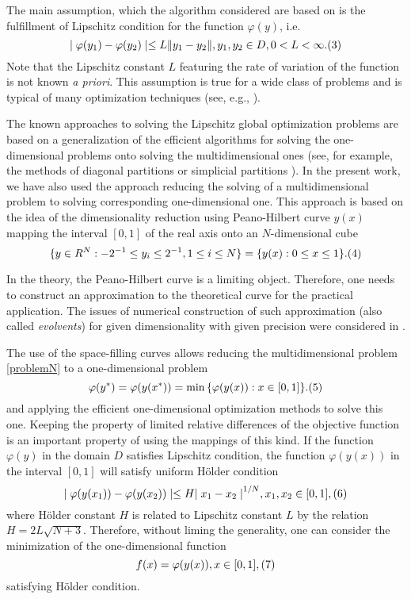 \documentclass[runningheads]{llncs}
\begin{document}
The main assumption, which the algorithm considered are based on is the fulfillment of Lipschitz condition for the function $\varphi(y)$, i.e.
$$ \mid \varphi(y_1) - \varphi(y_2) \mid \leq L\|y_1 - y_2\|, y_1, y_2 \in D, 0 < L < \infty. \relax(3)$$
Note that the Lipschitz constant $L$ featuring the rate of variation of the function is not known \textit{a priori}. This assumption is true for a wide class of problems and is typical of many optimization techniques (see, e.g., \cite{Evtushenko2013,Jones2009,Paulavicius2014}).

The known approaches to solving the Lipschitz global optimization problems are based on a generalization of the efficient algorithms for solving the one-dimensional problems onto solving the multidimensional ones (see, for example, the methods of diagonal partitions \cite{Sergeyev2017} or simplicial partitions \cite{PaulaviciusZilinskas2014}). In the present work, we have also used the approach reducing the solving of a multidimensional problem to solving corresponding one-dimensional one. This approach is based on the idea of the dimensionality reduction using Peano-Hilbert curve $y(x)$ mapping the interval $[0,1]$ of the real axis onto an $N$-dimensional cube 
$$ \{ y \in R^{N}: -2^{-1} \leq y_i \leq 2^{-1}, 1 \leq i \leq N\} = \{y(x): 0 \leq x \leq 1 \}.    \relax(4)$$

In the theory, the Peano-Hilbert curve is a limiting object. Therefore, one needs to construct an approximation to the theoretical curve for the practical application. The issues of numerical construction of such approximation (also called \textit{evolvents}) for given dimensionality with given precision were considered in \cite{Sergeyev2013}.

The use of the space-filling curves allows reducing the multidimensional problem \ref{problemN} to a one-dimensional problem 
$$\varphi(y^*) = \varphi(y(x^*)) = \min{\{ \varphi(y(x)): x \in [0, 1] \}}. \relax(5)$$
and applying the efficient one-dimensional optimization methods to solve this one. Keeping the property of limited relative differences of the objective function is an important property of using the mappings of this kind. If the function $\varphi(y)$ in the domain $D$ satisfies Lipschitz condition, the function $\varphi(y(x))$ in the interval $[0,1]$ will satisfy uniform H{\"o}lder condition
$$\mid \varphi(y(x_1)) - \varphi(y(x_2)) \mid \leq H {\mid x_1 - x_2 \mid}^{1/N}, x_1, x_2 \in [0,1], \relax(6)$$
where H{\"o}lder constant $H$ is related to Lipschitz constant $L$ by the relation $H = 2L\sqrt{N+3}$. Therefore, without liming the generality, one can consider the minimization of the one-dimensional function 
$$ f(x) = \varphi(y(x)), x \in [0,1], \relax(7)$$
satisfying H{\"o}lder condition.
\end{document}
